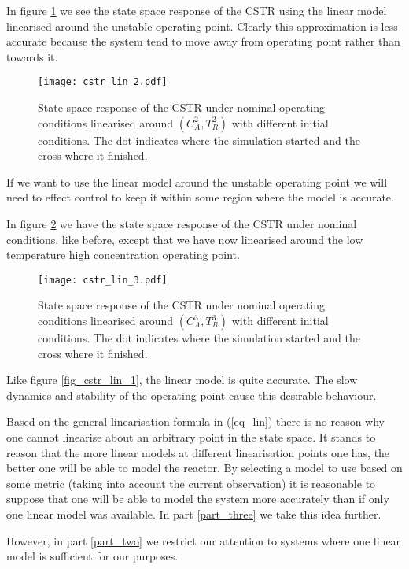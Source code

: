 In figure \ref{fig_cstr_lin_2} we see the state space response of the CSTR using the linear model linearised around the unstable operating point. Clearly this approximation is less accurate because the system tend to move away from operating point rather than towards it. 
\begin{figure}[H] 
\centering
\texttt{[image: cstr\_lin\_2.pdf]}
\caption{State space response of the CSTR under nominal operating conditions linearised around $(C_A^2,T_R^2)$ with different initial conditions. The dot indicates where the simulation started and the cross where it finished.}
\label{fig_cstr_lin_2}
\end{figure}
If we want to use the linear model around the unstable operating point we will need to effect control to keep it within some region where the model is accurate.

In figure \ref{fig_cstr_lin_3} we have the state space response of the CSTR under nominal conditions, like before, except that we have now linearised around the low temperature high concentration operating point. 
\begin{figure}[H] 
\centering
\texttt{[image: cstr\_lin\_3.pdf]}
\caption{State space response of the CSTR under nominal operating conditions linearised around $(C_A^3,T_R^3)$ with different initial conditions. The dot indicates where the simulation started and the cross where it finished.}
\label{fig_cstr_lin_3}
\end{figure}
Like figure \ref{fig_cstr_lin_1}, the linear model is quite accurate. The slow dynamics and stability of the operating point cause this desirable behaviour.

Based on the general linearisation formula in (\ref{eq_lin}) there is no reason why one cannot linearise about an arbitrary point in the state space. It stands to reason that the more linear models at different linearisation points one has, the better one will be able to model the reactor. By selecting a model to use based on some metric (taking into account the current observation) it is reasonable to suppose that one will be able to model the system more accurately than if only one linear model was available. In part \ref{part_three} we take this idea further.

However, in part \ref{part_two} we restrict our attention to systems where one linear model is sufficient for our purposes.  